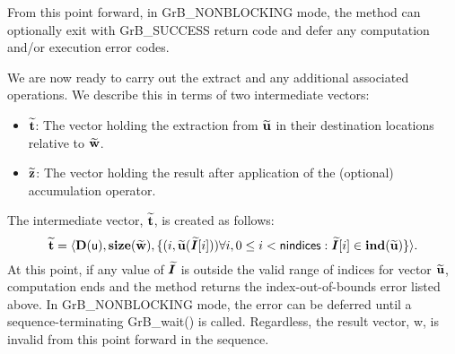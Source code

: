 From this point forward, in {\sf GrB\_NONBLOCKING} mode, the method can 
optionally exit with {\sf GrB\_SUCCESS} return code and defer any computation 
and/or execution error codes.

We are now ready to carry out the extract and any additional 
associated operations.  We describe this in terms of two intermediate vectors:
\begin{itemize}
	\item ${\bf \widetilde{t}}$: The vector holding the extraction from
    ${\bf \widetilde{u}}$ in their destination locations relative to
    ${\bf \widetilde{w}}$.
    
	\item ${\bf \widetilde{z}}$: The vector holding the result after 
    application of the (optional) accumulation operator.
\end{itemize}

The intermediate vector, ${\bf \widetilde{t}}$, is created as follows:
\[ 
{\bf \widetilde{t}} = \langle
\bold{D}({\sf u}), \bold{size}({\bf \widetilde{w}}),
\{(i,{\bf \widetilde{u}}(\bm{\widetilde{I}}[i])) \forall i, 0 \leq i < {\sf nindices} : 
\bm{\widetilde{I}}[i] \in \bold{ind}({\bf \widetilde{u}}) \} \rangle. 
\]
At this point, if any value of $\bm{\widetilde{I}}$ is outside the valid
range of indices for vector ${\bf \widetilde{u}}$, computation ends and the 
method returns the index-out-of-bounds error listed above. In 
{\sf GrB\_NONBLOCKING} mode, the error can be deferred until a 
sequence-terminating {\sf GrB\_wait()} is called.  Regardless, the result 
vector, {\sf w}, is invalid from this point forward in the 
sequence.

